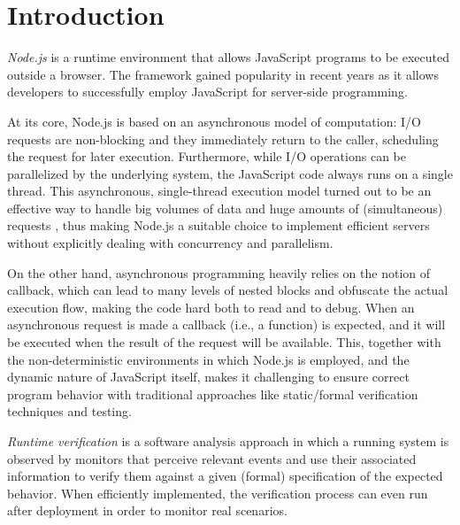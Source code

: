 \section{Introduction}
\emph{Node.js} is a runtime environment that allows JavaScript programs to be executed outside a browser.
The framework gained popularity in recent years as it allows developers to successfully employ JavaScript for server-side programming.

At its core, Node.js is based on an asynchronous model of computation: I/O requests are non-blocking and they immediately return to the caller, scheduling the request for later execution.
Furthermore, while I/O operations can be parallelized by the underlying system, the JavaScript code always runs on a single thread.
This asynchronous, single-thread execution model turned out to be an effective way to handle big volumes of data and huge amounts of (simultaneous) requests \cite{Nodejs10,NodejsPerformance14}, thus making Node.js a suitable choice to implement efficient servers without explicitly dealing with concurrency and parallelism.


%

On the other hand, asynchronous programming heavily relies on the notion of callback, which can lead to many levels of nested blocks and obfuscate the actual execution flow, making the code hard both to read and to debug.
When an asynchronous request is made a callback (i.e., a function) is expected, and it will be executed when the result of the request will be available.
This, together with the non-deterministic environments in which Node.js is employed, and the dynamic nature of JavaScript itself, makes it challenging to ensure correct program behavior with traditional approaches like static/formal verification techniques and testing.

\emph{Runtime verification} \cite{rv} is a software analysis approach in which a running system is observed by monitors that perceive relevant events and use their associated information to verify them against a given (formal) specification of the expected behavior.
When efficiently implemented, the verification process can even run after deployment in order to monitor real scenarios.


